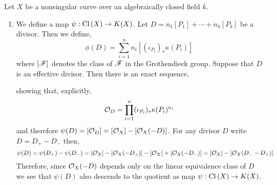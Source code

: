 \documentclass[12pt]{article}
\begin{document}
Let $X$ be a nonsingular curve over an algebraically closed field $k$. 
\begin{enumerate}
\item We define a map $\psi : \mathrm{Cl} \left( X \right) \to K(X)$. Let $D = n_1 [P_1] + \cdots + n_k [P_k]$ be a divisor. Then we define,
\[ \phi(D) = \sum_{i = 1}^n n_i [(\iota_{P_i})_* \kappa(P_i)] \]
where $[\mathscr{F}]$ denotes the class of $\mathscr{F}$ in the Grothendieck group. Suppose that $D$ is an effective divisor. Then there is an exact sequence,
\begin{center}
\end{center}
showing that, explicitly,
\[ \mathcal{O}_{D} = \prod_{i = 1}^n (\iota_{P_i})_* \kappa(P_i)^{n_i} \]
and therefore $\psi(D) = [\mathcal{O}_{D}] = [\mathcal{O}_{X}] - [\mathcal{O}_{X}(-D)]$. For any divisor $D$ write $D = D_+ - D_-$ then,
\[ \psi(D) = \psi(D_+) - \psi(D_-) = [\mathcal{O}_{X}] - [\mathcal{O}_{X}(-D_+)] - [\mathcal{O}_{X}] + [\mathcal{O}_{X}(-D_-)] = [\mathcal{O}_{X}] - [\mathcal{O}_{X}(D_- - D_+)] \]
Therefore, since $\mathcal{O}_{X}(-D)$ depends only on the linear equivalence class of $D$ we see that $\psi(D)$ also descends to the quotient as  map $\psi : \mathrm{Cl} \left( X \right) \to K(X)$.


\end{enumerate}
\end{document}

